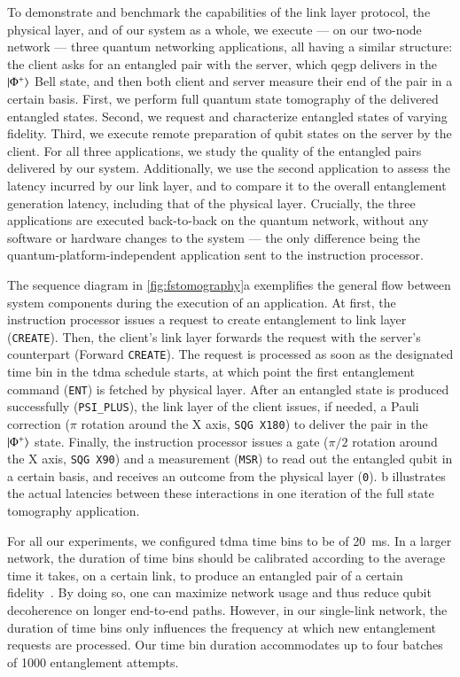 To demonstrate and benchmark the capabilities of the link layer protocol, the physical layer, and of
our system as a whole, we execute --- on our two-node network --- three quantum networking
applications, all having a similar structure: the client asks for an entangled pair with the server,
which \acrshort{qegp} delivers in the $\ket{\Phi^+}$ Bell state, and then both client and server
measure their end of the pair in a certain basis. First, we perform full quantum state tomography of
the delivered entangled states. Second, we request and characterize entangled states of varying
fidelity. Third, we execute remote preparation of qubit states on the server by the client. For all
three applications, we study the quality of the entangled pairs delivered by our system.
Additionally, we use the second application to assess the latency incurred by our link layer, and to
compare it to the overall entanglement generation latency, including that of the physical layer.
Crucially, the three applications are executed back-to-back on the quantum network, without any
software or hardware changes to the system --- the only difference being the
quantum-platform-independent application sent to the instruction processor.

The sequence diagram in \cref{fig:fstomography}a exemplifies the general flow between system
components during the execution of an application. At first, the instruction processor issues a
request to create entanglement to link layer (\texttt{CREATE}). Then, the client's link layer
forwards the request with the server's counterpart (Forward \texttt{CREATE}). The request is
processed as soon as the designated time bin in the \acrshort{tdma} schedule starts, at which point
the first entanglement command (\texttt{ENT}) is fetched by physical layer. After an entangled state
is produced successfully (\texttt{PSI\_PLUS}), the link layer of the client issues, if needed, a
Pauli correction ($\pi$ rotation around the X axis, \texttt{SQG X180}) to deliver the pair in the
$\ket{\Phi^+}$ state. Finally, the instruction processor issues a gate ($\pi/2$ rotation around the
X axis, \texttt{SQG X90}) and a measurement (\texttt{MSR}) to read out the entangled qubit in a
certain basis, and receives an outcome from the physical layer (\texttt{0}).
b illustrates the actual latencies between these interactions in one
iteration of the full state tomography application.

For all our experiments, we configured \acrshort{tdma} time bins to be of \qty{20}{\ms}. In a larger
network, the duration of time bins should be calibrated according to the average time it takes, on a
certain link, to produce an entangled pair of a certain fidelity~\cite{skrzypczyk_2021_arch}. By
doing so, one can maximize network usage and thus reduce qubit decoherence on longer end-to-end
paths. However, in our single-link network, the duration of time bins only influences the frequency
at which new entanglement requests are processed. Our time bin duration accommodates up to four
batches of \num{1000} entanglement attempts.

